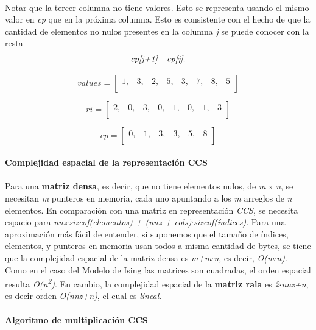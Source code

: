 \documentclass[a4paper,11pt]{article}
\begin{document}
\paragraph{}
Notar que la tercer columna no tiene valores. Esto se representa usando el
mismo valor en \emph{cp} que en la pr\'oxima columna. Esto es consistente con
el hecho de que la cantidad de elementos no nulos presentes en la columna
\emph{j} se puede conocer con la resta \[\emph{cp[j+1] - cp[j]}.\]

\[ values = \left[ \begin{array}{cccccccc}
1, & 3, & 2, & 5, & 3, & 7, & 8, & 5 \\\end{array} \right]\]

\[ ri = \left[ \begin{array}{cccccccc}
2, & 0, & 3, & 0, & 1, & 0, & 1, & 3 \\\end{array} \right]\]

\[ cp = \left[ \begin{array}{cccccc}
0, & 1, & 3, & 3, & 5, & 8\\\end{array} \right]\]
\\
\textbf{Complejidad espacial de la representaci\'on CCS}
\paragraph{}
Para una \textbf{matriz densa}, es decir, que no tiene elementos nulos, de
\emph{m} x \emph{n}, se necesitan \emph{m} punteros en memoria, cada uno
apuntando a los \emph{m} arreglos de \emph{n} elementos. En comparaci\'on con
una matriz en representaci\'on \emph{CCS}, se necesita espacio para
\emph{nnz$\cdot$sizeof(elementos) + (nnz + cols)$\cdot$sizeof(\'indices)}. Para una
aproximaci\'on m\'as f\'acil de entender, si suponemos que el tamaño de
\'indices, elementos, y punteros en memoria usan todos a misma cantidad de
bytes, se tiene que la complejidad espacial de la matriz densa es
\emph{m+m$\cdot$n}, es decir, \emph{O(m$\cdot$n)}. Como en el caso del Modelo
de Ising las matrices son cuadradas, el orden espacial resulta
\emph{O(n\textsuperscript{2})}. En cambio, la complejidad espacial de la
\textbf{matriz rala} es \emph{2$\cdot$nnz+n}, es decir orden \emph{O(nnz+n)},
el cual es \emph{lineal}.\\
\\
\textbf{Algoritmo de multiplicaci\'on CCS}
\end{document}
